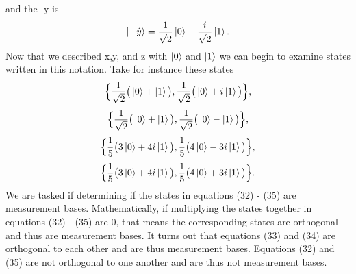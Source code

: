 \documentclass[twocolumn]{article}
\begin{document}
and the -y is
\begin{equation}
\ket{-\hat{y}}=\frac{1}{\sqrt{2}}\ket{0}-\frac{i}{\sqrt{2}}\ket{1}.
\end{equation}
Now that we described x,y, and z with $\ket{0}$ and $\ket{1}$ we can begin to examine states written in this notation. Take for instance these states
\begin{equation}
\Big\{ \frac{1}{\sqrt{2}}\big(\ket{0} + \ket{1}\big), \frac{1}{\sqrt{2}}\big(\ket{0}+i\ket{1}\big)\Big\},
\end{equation}
\begin{equation}
\Big\{ \frac{1}{\sqrt{2}}\big(\ket{0} + \ket{1}\big), \frac{1}{\sqrt{2}}\big(\ket{0}-\ket{1}\big)\Big\},
\end{equation}
\begin{equation}
\Big\{ \frac{1}{5}\big(3\ket{0}+4i\ket{1}\big), \frac{1}{5}\big(4\ket{0}-3i\ket{1}\big)\Big\},
\end{equation}
\begin{equation}
\Big\{\frac{1}{5}\big(3\ket{0}+4i\ket{1}\big), \frac{1}{5}\big(4\ket{0}+3i\ket{1}\big)\Big\}.
\end{equation}
We are tasked if determining if the states in equations (32) - (35) are measurement bases. Mathematically, if multiplying the states together in equations (32) - (35) are 0, that means the corresponding states are orthogonal and thus are measurement bases. It turns out that equations (33) and (34) are orthogonal to each other and are thus measurement bases. Equations (32) and (35) are not orthogonal to one another and are thus not measurement bases.
\end{document}
